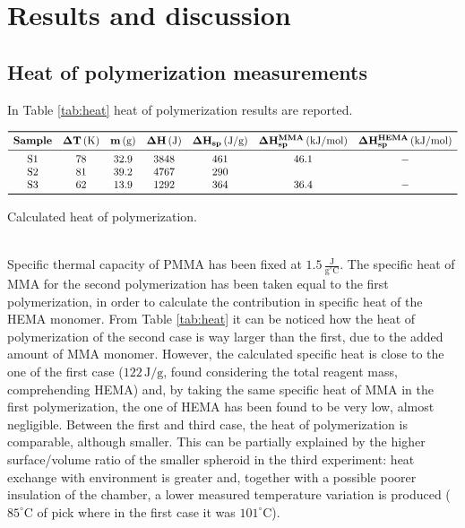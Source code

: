 \documentclass[a4paper, 11pt]{article}
\begin{document}
\newpage
\section{Results and discussion}

\subsection{Heat of polymerization measurements}

In Table \ref{tab:heat} heat of polymerization results are reported. 
\begin{table}[htp]
\centering
$
\begin{array}{ccccccc}
\toprule
\textbf{Sample} & \mathbf{\Delta T}\,(\text{K}) &  \mathbf{m}\,(\text{g}) & \mathbf{\Delta H}\,(\text{J}) & \mathbf{\Delta H_{sp}}\,(\text{J}/\text{g}) & \mathbf{\Delta H_{sp}^{MMA}}\,(\text{kJ}/\text{mol}) & \mathbf{\Delta H_{sp}^{HEMA}}\,(\text{kJ}/\text{mol}) \\
\midrule
\text{S1} & 78 & 32.9 & 3848 & 461 & 46.1 & -\\
\text{S2} & 81 & 39.2 & 4767 & 290 &  &  \\
\text{S3} & 62 & 13.9 & 1292 & 364 & 36.4 & - \\
\bottomrule
\end{array}
$
\caption{Calculated heat of polymerization.}
\label{tab:heat}
\end{table}\\
Specific thermal capacity of PMMA has been fixed at $1.5 \,\frac{\text{J}}{\text{g}^\circ\text{C}}$.
The specific heat of MMA for the second polymerization has been taken equal to the first polymerization, in order to calculate the contribution in specific heat of the HEMA monomer. From Table \ref{tab:heat} it can be noticed how the heat of polymerization of the second case is way larger than the first, due to the added amount of MMA monomer. However, the calculated specific heat is close to the one of the first case ($122\,\text{J}/\text{g}$, found considering the total reagent mass, comprehending HEMA) and, by taking the same specific heat of MMA in the first polymerization, the one of HEMA has been found to be very low, almost negligible. Between the first and third case, the heat of polymerization is comparable, although smaller. This can be partially explained by the higher surface/volume ratio of the smaller spheroid in the third experiment: heat exchange with environment is greater and, together with a possible poorer insulation of the chamber, a lower measured temperature variation is produced ($85^\circ$C of pick where in the first case it was $101^\circ$C). \\
\end{document}
